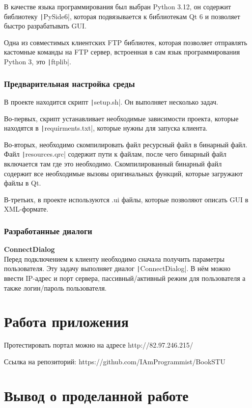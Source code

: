 \documentclass[a4paper,14pt]{extarticle}
\begin{document}
В качестве языка программирования был выбран Python 3.12, он содержит библиотеку \texttt|PySide6|, которая
подвязывается к библиотекам Qt 6 и позволяет быстро разрабатывать GUI. 

Одна из совместимых клиентских FTP библиотек, которая позволяет отправлять 
кастомные команды на FTP сервер, встроенная в сам язык программирования
Python 3, это \texttt|ftplib|.

\subsubsection{Предварительная настройка среды}
В проекте находится скрипт \texttt|setup.sh|. Он выполняет несколько задач. 

Во-первых, скрипт устанавливает необходимые зависимости проекта, которые находятся в \texttt|requirments.txt|, 
которые нужны для запуска клиента. 

Во-вторых, необходимо скомпилировать файл ресурсный файл в бинарный файл. Файл \texttt|resources.qrc| содержит
пути к файлам, после чего бинарный файл включается там где это необходимо. Скомпилированный бинарный файл 
содержит все необходимые вызовы оригинальных функций, которые загружают файлы в Qt. 

В-третьих, в проекте используются .ui файлы, которые позволяют описать GUI в XML-формате. 

\subsubsection{Разработанные диалоги}
\textbf{ConnectDialog}\\
Перед подключением к клиенту необходимо сначала получить параметры пользователя. 
Эту задачу выполняет диалог \texttt|ConnectDialog|. В нём можно 
ввести IP-адрес и порт сервера, пассивный/активный режим для пользователя а 
также логин/пароль пользователя. 

\section{Работа приложения}

Протестировать портал можно на адресе http://82.97.246.215/

Ссылка на репозиторий: https://github.com/IAmProgrammist/BookSTU

\section{Вывод о проделанной работе}
\end{document}
